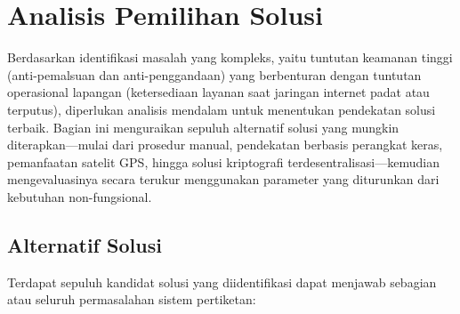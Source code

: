 \section{Analisis Pemilihan Solusi}
\label{sec:pemilihan_solusi}

Berdasarkan identifikasi masalah yang kompleks, yaitu tuntutan keamanan tinggi (anti-pemalsuan dan anti-penggandaan) yang berbenturan dengan tuntutan operasional lapangan (ketersediaan layanan saat jaringan internet padat atau terputus), diperlukan analisis mendalam untuk menentukan pendekatan solusi terbaik. Bagian ini menguraikan sepuluh alternatif solusi yang mungkin diterapkan—mulai dari prosedur manual, pendekatan berbasis perangkat keras, pemanfaatan satelit GPS, hingga solusi kriptografi terdesentralisasi—kemudian mengevaluasinya secara terukur menggunakan parameter yang diturunkan dari kebutuhan non-fungsional.

\subsection{Alternatif Solusi}
\label{subsec:alternatif_solusi}
Terdapat sepuluh kandidat solusi yang diidentifikasi dapat menjawab sebagian atau seluruh permasalahan sistem pertiketan:

